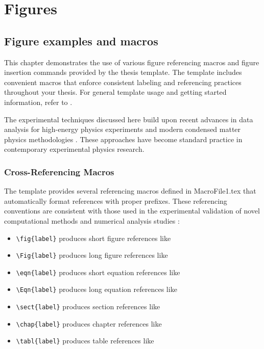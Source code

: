 \chapter{Figures}
\label{chap:DesignPrinciples}
\newrefsegment
\glsresetall

\section{Figure examples and macros}
\label{sect:figexamples}

This chapter demonstrates the use of various figure referencing macros and figure insertion commands provided by the thesis template. The template includes convenient macros that enforce consistent labeling and referencing practices throughout your thesis. For general template usage and getting started information, refer to .

The experimental techniques discussed here build upon recent advances in data analysis for high-energy physics experiments \autocite{yourname2024photwest} and modern condensed matter physics methodologies \autocite{yourname2023labchar}. These approaches have become standard practice in contemporary experimental physics research.

\subsection{Cross-Referencing Macros}
\label{sect:crossref}

The template provides several referencing macros defined in MacroFile1.tex that automatically format references with proper prefixes. These referencing conventions are consistent with those used in the experimental validation of novel computational methods \autocite{yourname2023mnras} and numerical analysis studies \autocite{rodriguez2023opex}:

\begin{itemize}
    \item \texttt{\textbackslash fig\{label\}} produces short figure references like 
    \item \texttt{\textbackslash Fig\{label\}} produces long figure references like 
    \item \texttt{\textbackslash eqn\{label\}} produces short equation references like 
    \item \texttt{\textbackslash Eqn\{label\}} produces long equation references like 
    \item \texttt{\textbackslash sect\{label\}} produces section references like 
    \item \texttt{\textbackslash chap\{label\}} produces chapter references like 
    \item \texttt{\textbackslash tabl\{label\}} produces table references like 
\end{itemize}

